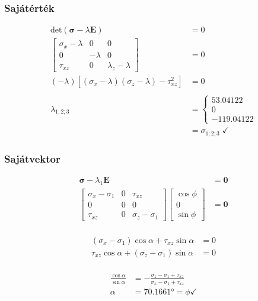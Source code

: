 \subsubsection{Sajátérték}
\begin{align*}
	\text{det}(\pmb{\sigma} - \lambda\pmb{E}) &= 0 \\
	\begin{bmatrix}
		\sigma_x - \lambda & 0 & 0 \\
		0 & -\lambda & 0 \\
		\tau_{xz} & 0 & \lambda_z - \lambda
	\end{bmatrix} &= 0 \\
	(-\lambda)\left[(\sigma_x - \lambda)(\sigma_z - \lambda) - \tau_{xz}^2\right] &= 0 \\ \\
	\lambda_{1;2;3} &= \begin{cases}
		53.04122 \\
		0 \\
		-119.04122
	\end{cases} \\&= \sigma_{1;2;3} \; \checkmark
\end{align*}

\subsubsection{Sajátvektor}
\begin{align*}
	\pmb{\sigma} - \lambda_1 \pmb{E} &= \pmb{0} \\
	\begin{bmatrix}
		\sigma_x - \sigma_1 & 0 & \tau_{xz} \\
		0 & 0 & 0 \\
		\tau_{xz} & 0 & \sigma_z - \sigma_1 
	\end{bmatrix} \begin{bmatrix}
		\cos \phi \\
		0 \\
		\sin \phi
	\end{bmatrix} &= \pmb{0} \\
\end{align*}

\begin{align*}
	(\sigma_x - \sigma_1)\cos \alpha + \tau_{xz} \sin \alpha &= 0 \\
	 \tau_{xz} \cos \alpha + (\sigma_z - \sigma_1)\sin \alpha &= 0 \\
\end{align*}

\begin{align*}
	 \frac{\cos \alpha}{\sin \alpha} &= -\frac{\sigma_z - \sigma_1 + \tau_{xz}}{\sigma_x - \sigma_1 + \tau_{xz}} \\
	 \alpha &= \ang{70.1661} = \phi \checkmark
\end{align*}

